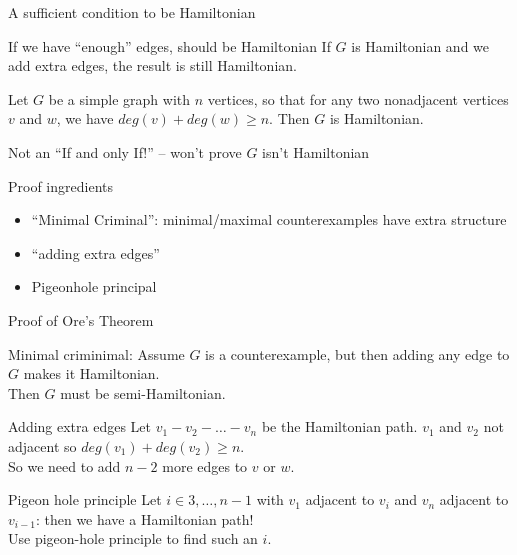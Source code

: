 \documentclass{beamer}
\begin{document}
\begin{frame}{A sufficient condition to be Hamiltonian}
\begin{block}{If we have ``enough'' edges, should be Hamiltonian}
  If $G$ is Hamiltonian and we add extra edges, the result is still Hamiltonian.
\end{block}

\begin{theorem}[Ore] Let $G$ be a simple graph with $n$ vertices, so that for any two nonadjacent vertices $v$ and $w$, we have $deg(v)+deg(w)\geq n$.  Then $G$ is Hamiltonian.
\end{theorem}
\alert{Not an ``If and only If!'' -- won't prove $G$ isn't Hamiltonian}
\begin{block}{Proof ingredients}
  \begin{itemize}
    \item ``Minimal Criminal'': minimal/maximal counterexamples have extra structure
    \item ``adding extra edges''
    \item Pigeonhole principal
\end{itemize}
  \end{block}
\end{frame}



\begin{frame}{Proof of Ore's Theorem}
\begin{block}{Minimal criminimal:}
  Assume $G$ is a counterexample, but then adding any edge to $G$ makes it Hamiltonian.  \\ Then $G$ must be semi-Hamiltonian.
\end{block}
  \begin{block}{Adding extra edges}
  Let $v_1-v_2-\dots-v_n$ be the Hamiltonian path.  $v_1$ and $v_2$ not adjacent so $deg(v_1)+deg(v_2)\geq n$.  \\
  So we need to add $n-2$ more edges to $v$ or $w$.
\end{block}
\begin{block}{Pigeon hole principle}
  Let $i\in 3,\dots, n-1$ with $v_1$ adjacent to $v_i$ and $v_n$ adjacent to $v_{i-1}$: then we have a Hamiltonian path! \\
  Use pigeon-hole principle to find such an $i$.
  \end{block}
  \end{frame}
\end{document}
